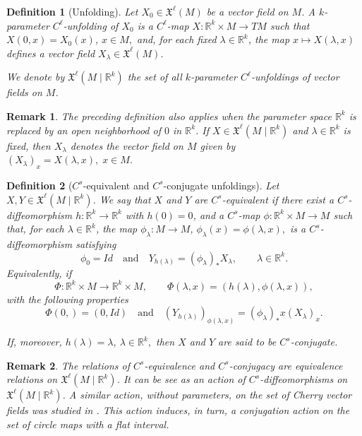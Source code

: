 \documentclass[12pt]{article}
\newtheorem{definition}{Definition}[section]
\newtheorem{remark}{Remark}[section]
\newtheorem{remark definition}{Remark Definition}[section]
\begin{document}
	\begin{definition}[Unfolding]
		Let $X_0\in \mathfrak{X}^{\ell}(M)$ be a vector field on $M$. A
		$k$-parameter $C^\ell$-unfolding of $X_0$ is a $C^\ell$-map
		$
		X:\mathbb{R}^k\times M\longrightarrow TM
		$
		such that
		$
		X(0,x)=X_0(x)$, $x\in M,$
		and, for each fixed $\lambda\in \mathbb{R}^k$, the map
		$
		x\longmapsto X(\lambda,x)
		$
		defines a vector field $X_\lambda\in \mathfrak{X}^{\ell}(M)$.
		
		We denote by
		$
		\mathfrak{X}^{\ell}(M\mid \mathbb{R}^k)
		$
		the set of all $k$-parameter $C^\ell$-unfoldings of vector fields on $M$.
	\end{definition}
	
	\begin{remark}
		The preceding definition also applies when the parameter space
		$\mathbb{R}^k$ is replaced by an open neighborhood of $0$ in
		$\mathbb{R}^k$.		
		If $X\in \mathfrak{X}^{\ell}(M\mid \mathbb{R}^k)$ and
		$\lambda\in \mathbb{R}^k$ is fixed, then $X_\lambda$ denotes the vector
		field on $M$ given by
		$
		(X_\lambda)_x=X(\lambda,x),
		\;
		x\in M.
		$
	\end{remark}
	
	\begin{definition}[$C^s$-equivalent and $C^s$-conjugate unfoldings]
		Let $X,Y\in \mathfrak{X}^{\ell}(M\mid \mathbb{R}^k)$. We say that $X$ and
		$Y$ are $C^s$-equivalent if there exist a $C^s$-diffeomorphism
		$h:\mathbb{R}^k\longrightarrow \mathbb{R}^k$
		with $h(0)=0$, and a $C^s$-map $
		\phi:\mathbb{R}^k\times M\longrightarrow M$
		such that, for each $\lambda\in \mathbb{R}^k$, the map $
		\phi_\lambda:M\longrightarrow M$,
		$\phi_\lambda(x)=\phi(\lambda,x),$
		is a $C^s$-diffeomorphism satisfying 
		$$\phi_0=Id \quad\text{and}\quad
		Y_{h(\lambda)}
		=
		(\phi_\lambda)_*X_\lambda,
		\qquad
		\lambda\in \mathbb{R}^k.
		$$
		Equivalently, if
		$$
		\Phi:\mathbb{R}^k\times M\longrightarrow \mathbb{R}^k\times M,
		\qquad
		\Phi(\lambda,x)=(h(\lambda),\phi(\lambda,x)),
		$$
		with the following properties
		$$
		\Phi(0,)=(0,Id)\quad\text{and} \quad (Y_{h(\lambda)})_{\phi(\lambda,x)}
		=
		(\phi_\lambda)_*x(X_\lambda)_x.
		$$
		
		If, moreover, $
		h(\lambda)=\lambda$, $\lambda\in \mathbb{R}^k,$
		then $X$ and $Y$ are said to be $C^s$-conjugate.
	\end{definition}
	
	\begin{remark}
		The relations of $C^s$-equivalence and $C^s$-conjugacy are equivalence
		relations on $\mathfrak{X}^{\ell}(M\mid \mathbb{R}^k)$. It can be see as an action of $C^s$-diffeomorphisms on $
		\mathfrak{X}^{\ell}(M\mid \mathbb{R}^k)
		$. A similar action, without parameters, on the set of Cherry vector fields was studied in \cite{TNB4}. This action induces, in turn, a conjugation action on
		the set of circle maps with a flat interval.
	\end{remark}
	
\end{document}
